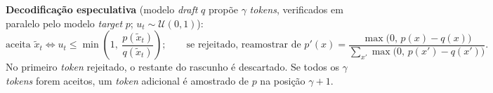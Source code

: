 \documentclass[11pt,a4paper]{article}
\begin{document}
\textbf{Decodificação especulativa} (modelo \textit{draft} $q$ propõe $\gamma$ \textit{tokens}, verificados em paralelo pelo modelo \textit{target} $p$; $u_t \sim \mathcal{U}(0,1)$):
\[
  \text{aceita } \tilde{x}_t \iff u_t \le \min\!\left(1,\ \frac{p(\tilde{x}_t)}{q(\tilde{x}_t)}\right);
  \qquad
  \text{se rejeitado, reamostrar de } p'(x) = \frac{\max\bigl(0,\, p(x) - q(x)\bigr)}{\sum_{x'} \max\bigl(0,\, p(x') - q(x')\bigr)}.
\]
No primeiro \textit{token} rejeitado, o restante do rascunho é descartado.
Se todos os $\gamma$ \textit{tokens} forem aceitos, um \textit{token} adicional é amostrado de $p$ na posição $\gamma + 1$.
\end{document}
